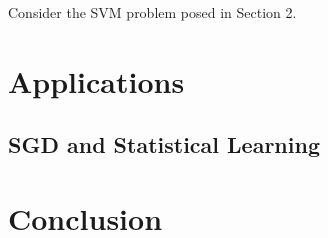 \documentclass{article}
\begin{document}
Consider the SVM problem posed in Section 2.


\section{Applications}

\subsection{SGD and Statistical Learning}

\section{Conclusion}

\printbibliography
\end{document}
